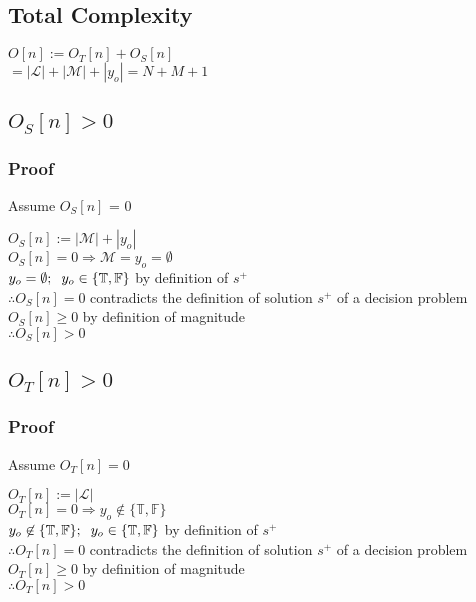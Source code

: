 \documentclass[11pt]{article}
\begin{document}
\subsection{Total Complexity}
\begin{center}
$O[n] := O_T[n] + O_S[n]$
\\ \vspace{2mm}
$= |\mathcal{L}| + |\mathcal{M}| + |y_o| = N + M + 1$
\end{center}


\subsection{$O_S[n] > 0$}
\subsubsection{Proof}
Assume $O_S[n]$ = 0
\begin{center}
$
O_S[n] := |\mathcal{M}| + |y_o| 
$
\\ \vspace{2mm}
$
O_S[n] = 0 \Rightarrow \mathcal{M} = y_o = \emptyset
$
\\ \vspace{2mm}
$
y_o = \emptyset; \hspace{2mm} y_o \in \{\mathbb{T},\mathbb{F}\}$ by definition of $s^+$
\\ \vspace{4mm}
$
\therefore O_S[n] = 0$ contradicts the definition of solution $s^+$ of a decision problem
\\ \vspace{2mm}
$
O_S[n] \geq 0$ by definition of magnitude
\\ \vspace{2mm}
$
\therefore O_S[n] > 0
$
\end{center}


\subsection{$O_T[n] > 0$}
\subsubsection{Proof}
Assume $O_T[n] = 0$
\begin{center}
$
O_T[n] := |\mathcal{L}| 
$
\\ \vspace{2mm}
$
O_T[n] = 0 \Rightarrow y_o \not \in \{\mathbb{T},\mathbb{F}\}
$
\\ \vspace{2mm}
$
y_o \not \in \{\mathbb{T},\mathbb{F}\}; \hspace{2mm} y_o \in \{\mathbb{T},\mathbb{F}\}$ by definition of $s^+$
\\ \vspace{4mm}
$
\therefore O_T[n] = 0$ contradicts the definition of solution $s^+$ of a decision problem
\\ \vspace{2mm}
$
O_T[n] \geq 0$ by definition of magnitude
\\ \vspace{2mm}
$
\therefore O_T[n] > 0
$
\end{center}
\end{document}
